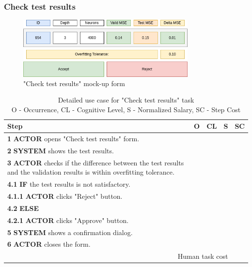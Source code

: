 \subsubsection{Check test results}

\begin{figure}[H]
\centering
\includegraphics[width=0.8\textwidth]{figures/check_test_results.png}
\caption{"Check test results" mock-up form}
\end{figure}

\begin{table}[H]
\centering
\begin{tabularx}{\textwidth}{|X|c|c|c|c|}
\hline
\textbf{Step} & \textbf{O} & \textbf{CL} & \textbf{S} & \textbf{SC} \\
\hline
\textbf{1} \textbf{ACTOR} opens "Check test results" form. & & & & \\
\hline
\textbf{2} \textbf{SYSTEM} shows the test results. & & & & \\
\hline
\textbf{3} \textbf{ACTOR} checks if the difference between the test results and the validation results is within overfitting tolerance. & & & & \\
\hline
\textbf{4.1} \textbf{IF} the test results is not satisfactory. & & & & \\
\hline
\textbf{4.1.1} \textbf{ACTOR} clicks "Reject" button. & & & & \\
\hline
\textbf{4.2} \textbf{ELSE} & & & & \\
\hline
\textbf{4.2.1} \textbf{ACTOR} clicks "Approve" button. & & & & \\
\hline
\textbf{5} \textbf{SYSTEM} shows a confirmation dialog. & & & & \\
\hline
\textbf{6} \textbf{ACTOR} closes the form. & & & & \\
\hline
\multicolumn{4}{|r|}{Human task cost} & \\
\hline
\end{tabularx}
\caption{Detailed use case for "Check test results" task\\ 
O - Occurrence, CL - Cognitive Level, S - Normalized Salary, SC - Step Cost}
\label{table:check_test_results}
\end{table}


